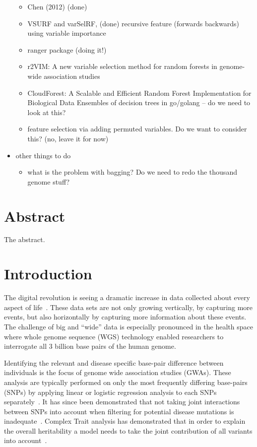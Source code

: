 \documentclass[10pt,a4paper]{article}  %
\begin{document}
\begin{itemize}
\begin{itemize}
  \item Chen (2012)  (done)
  \item VSURF and  varSelRF, (done) recursive feature (forwards backwards) using variable importance
  \item \cite{Wright.and.Ziegle.2016} ranger package (doing it!)
  \item  r2VIM: A new variable selection method for random forests in
    genome-wide association studies
  \item CloudForest: A Scalable and Efficient Random Forest
    Implementation for Biological Data
   Ensembles of decision trees in go/golang   --  do we need to look
   at this? 
  \item \cite{Tuv.et.al.2009} feature selection via adding permuted variables. Do we want to consider this? (no, leave it for now)
  \end{itemize}
\item other things to do
  \begin{itemize}
  \item what is the problem with bagging? Do we need to redo the thousand genome stuff?
  \end{itemize}
\end{itemize}


\clearpage

\section{Abstract}
The abstract.

\linenumbers

\section{Introduction}

The digital revolution is seeing a dramatic increase in data collected about every aspect of life~\cite{Loebbecke2015}.
These data sets are not only growing vertically, by capturing more events, but also horizontally by capturing
more information about these events.  The challenge of big and ``wide'' data is especially pronounced in the health
space where whole genome sequence (WGS) technology enabled researchers to interrogate all 3 billion base pairs of the
human genome.

Identifying the relevant and disease specific base-pair difference between individuals is the focus of genome wide
association studies (GWAs).  These analysis are typically performed on only the most frequently differing base-pairs
(SNPs) by applying linear or logistic regression analysis to each SNPs separately~\cite{CCC2007}.  It has since been
demonstrated that not taking joint interactions between SNPs into account when filtering for potential disease mutations
is inadequate~\cite{Manolio2009}.  Complex Trait analysis has demonstrated that in order to explain the overall
heritability a model needs to take the joint contribution of all variants into account~\cite{Yang2011}.
\end{document}
